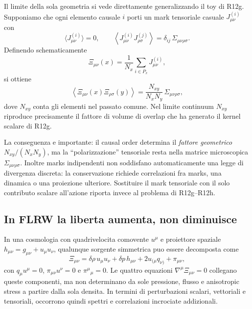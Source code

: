 \documentclass[11pt,a4paper]{article}
\begin{document}
Il limite della sola geometria si vede direttamente generalizzando il toy di R12g. Supponiamo che ogni elemento causale $i$ porti un mark tensoriale casuale $J^{(i)}_{\mu\nu}$ con
\begin{equation}
 \langle J^{(i)}_{\mu\nu}\rangle=0,
 \qquad
 \left\langle
 J^{(i)}_{\mu\nu}J^{(j)}_{\rho\sigma}
 \right\rangle
 =\delta_{ij}\,\Sigma_{\mu\nu\rho\sigma}.
 \label{eq:r12i_marks}
\end{equation}
Definendo schematicamente
\begin{equation}
 \Xi_{\mu\nu}(x)
 =\frac{1}{N_x}\sum_{i\in P_x}J^{(i)}_{\mu\nu},
 \label{eq:r12i_marked_sum}
\end{equation}
si ottiene
\begin{equation}
 \boxed{
 \left\langle\Xi_{\mu\nu}(x)\Xi_{\rho\sigma}(y)\right\rangle
 =\frac{N_{xy}}{N_xN_y}\,\Sigma_{\mu\nu\rho\sigma},
 }
 \label{eq:r12i_factorized_cov}
\end{equation}
dove $N_{xy}$ conta gli elementi nel passato comune. Nel limite continuum $N_{xy}$ riproduce precisamente il fattore di volume di overlap che ha generato il kernel scalare di R12g.

La conseguenza e importante: il causal order determina il \emph{fattore geometrico} $N_{xy}/(N_xN_y)$, ma la ``polarizzazione'' tensoriale resta nella matrice microscopica $\Sigma_{\mu\nu\rho\sigma}$. Inoltre marks indipendenti non soddisfano automaticamente una legge di divergenza discreta: la conservazione richiede correlazioni fra marks, una dinamica o una proiezione ulteriore. Sostituire il mark tensoriale con il solo contributo scalare all'azione riporta invece al problema di R12g--R12h.

\subsection{In FLRW la liberta aumenta, non diminuisce}

In una cosmologia con quadrivelocita comovente $u^\mu$ e proiettore spaziale $h_{\mu\nu}=g_{\mu\nu}+u_\mu u_\nu$, qualunque sorgente simmetrica puo essere decomposta come
\begin{equation}
 \boxed{
 \Xi_{\mu\nu}
 =\delta\rho\,u_\mu u_\nu
 +\delta p\,h_{\mu\nu}
 +2u_{(\mu}q_{\nu)}
 +\pi_{\mu\nu},
 }
 \label{eq:r12i_flrw_decomp}
\end{equation}
con $q_\mu u^\mu=0$, $\pi_{\mu\nu}u^\nu=0$ e $\pi^\mu{}_{\mu}=0$. Le quattro equazioni $\nabla^\mu\Xi_{\mu\nu}=0$ collegano queste componenti, ma non determinano da sole pressione, flusso e anisotropic stress a partire dalla sola densita. In termini di perturbazioni scalari, vettoriali e tensoriali, occorrono quindi spettri e correlazioni incrociate addizionali.
\end{document}
